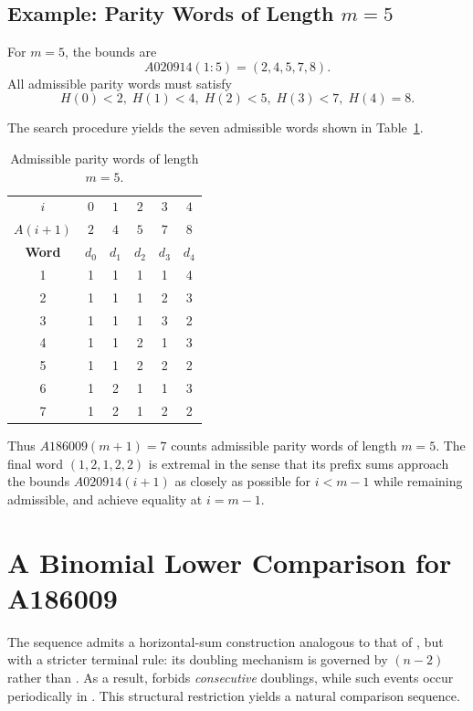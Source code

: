 \documentclass[12pt, oneside]{article}   	%
\numberwithin{equation}{section}          %
\theoremstyle{definition}
\begin{document}
\subsection*{Example: Parity Words of Length $m=5$}

For $m=5$, the bounds are
\[
A020914(1{:}5) = (2,4,5,7,8).
\]
All admissible parity words must satisfy
\[
H(0)<2,\; H(1)<4,\; H(2)<5,\; H(3)<7,\; H(4)=8.
\]

The search procedure yields the seven admissible words shown in
Table~\ref{tab:m5-words}.

\begin{table}[h]
\centering
\caption{Admissible parity words of length $m=5$.}
\label{tab:m5-words}
\vspace{4pt}
\begin{tabular}{c|ccccc}
$i$ & $0$ & $1$ & $2$ & $3$ & $4$ \\
$A(i+1)$ & $2$ & $4$ & $5$ & $7$ & $8$ \\ \hline
\textbf{Word} & $d_0$ & $d_1$ & $d_2$ & $d_3$ & $d_4$ \\ \hline
1 & 1 & 1 & 1 & 1 & 4 \\
2 & 1 & 1 & 1 & 2 & 3 \\
3 & 1 & 1 & 1 & 3 & 2 \\
4 & 1 & 1 & 2 & 1 & 3 \\
5 & 1 & 1 & 2 & 2 & 2 \\
6 & 1 & 2 & 1 & 1 & 3 \\
7 & 1 & 2 & 1 & 2 & 2 \\
\end{tabular}
\end{table}

Thus $A186009(m+1)=7$ counts admissible parity words of length $m=5$.  
The final word $(1,2,1,2,2)$ is extremal in the sense that its prefix sums
approach the bounds $A020914(i+1)$ as closely as possible for $i<m-1$
while remaining admissible, and achieve equality at $i=m-1$.


\newpage
\section{A Binomial Lower Comparison for A186009}
\label{app:A047749-lower-bound}

The sequence  admits a horizontal-sum construction analogous to that
of , but with a stricter terminal rule: its doubling mechanism is
governed by $(n-2)$ rather than . As a result,
 forbids \emph{consecutive} doublings, while such events occur
periodically in . This structural restriction yields a natural
comparison sequence.
\end{document}
